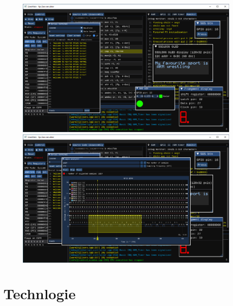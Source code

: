 \documentclass[compress]{beamer}
\begin{document}
\begin{frame}
\begin{overlayarea}{\textwidth}{\textheight}
\begin{figure}
{			}%
			\only<5>
			{%
				\includegraphics[width=.85\textwidth]{img/screenshot-06.pdf}%
			}%
			\only<6>
			{%
				\includegraphics[width=.85\textwidth]{img/screenshot-07.pdf}%
			}%
		\end{figure}
	\end{overlayarea}      
\end{frame}

\section{Technlogie}
\end{document}
